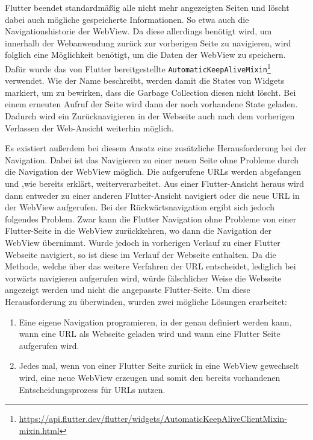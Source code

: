 Flutter beendet standardmäßig alle nicht mehr angezeigten Seiten und löscht dabei auch mögliche gespeicherte Informationen. So etwa auch die Navigationshistorie der WebView.
Da diese allerdings benötigt wird, um innerhalb der Webanwendung zurück zur vorherigen Seite zu navigieren, wird folglich eine Möglichkeit benötigt, um die Daten der WebView zu speichern. Dafür wurde das von Flutter bereitgestellte \verb|AutomaticKeepAliveMixin|\footnote{\url{https://api.flutter.dev/flutter/widgets/AutomaticKeepAliveClientMixin-mixin.html}} verwendet. 
Wie der Name beschreibt, werden damit die States von Widgets markiert, um zu bewirken, dass die Garbage Collection diesen nicht löscht. 
Bei einem erneuten Aufruf der Seite wird dann der noch vorhandene State geladen. Dadurch wird ein Zurücknavigieren in der Webseite auch nach dem vorherigen Verlassen der Web-Ansicht weiterhin möglich.

Es existiert außerdem bei diesem Ansatz eine zusätzliche Herausforderung bei der Navigation.
Dabei ist das Navigieren zu einer neuen Seite ohne Probleme durch die Navigation der WebView möglich. Die aufgerufene URLs werden abgefangen und ,wie bereits erklärt, weiterverarbeitet. Aus einer Flutter-Ansicht heraus wird dann entweder zu einer anderen Flutter-Ansicht navigiert oder die neue URL in der WebView aufgerufen. Bei der Rückwärtsnavigation ergibt sich jedoch folgendes Problem. Zwar kann die Flutter Navigation ohne Probleme von einer Flutter-Seite in die WebView zurückkehren, wo dann die Navigation der WebView übernimmt. Wurde jedoch in vorherigen Verlauf zu einer Flutter Webseite navigiert, so ist diese im Verlauf der Webseite enthalten. Da die Methode, welche über das weitere Verfahren der URL entscheidet, lediglich bei vorwärts navigieren aufgerufen wird, würde fälschlicher Weise die Webseite angezeigt werden und nicht die angepasste Flutter-Seite.
Um diese Herausforderung zu überwinden, wurden zwei mögliche Lösungen erarbeitet:
\begin{enumerate}
    \item Eine eigene Navigation programieren, in der genau definiert werden kann, wann eine URL als Webseite geladen wird und wann eine Flutter Seite aufgerufen wird. 
    \item Jedes mal, wenn von einer Flutter Seite zurück in eine WebView gewechselt wird, eine neue WebView erzeugen und somit den bereits vorhandenen Entscheidungsprozess für URLs nutzen. 
\end{enumerate}

